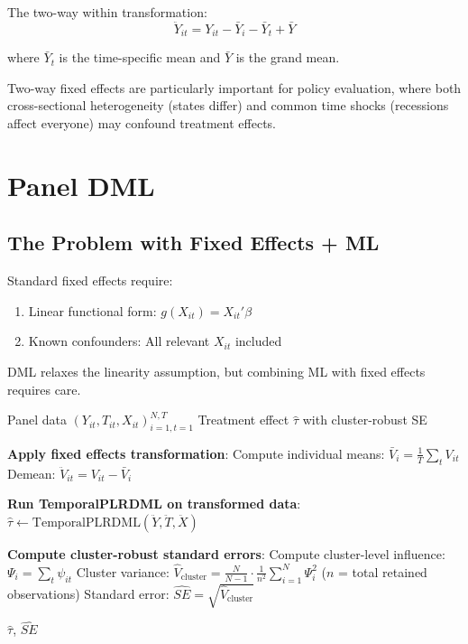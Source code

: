 The two-way within transformation:
\begin{equation}
\ddot{Y}_{it} = Y_{it} - \bar{Y}_i - \bar{Y}_t + \bar{Y}
\end{equation}

where $\bar{Y}_t$ is the time-specific mean and $\bar{Y}$ is the grand mean.

\begin{remark}
Two-way fixed effects are particularly important for policy evaluation, where both cross-sectional heterogeneity (states differ) and common time shocks (recessions affect everyone) may confound treatment effects.
\end{remark}

\section{Panel DML}\label{sec:panel_dml}

\subsection{The Problem with Fixed Effects + ML}

Standard fixed effects require:
\begin{enumerate}
    \item Linear functional form: $g(X_{it}) = X_{it}'\beta$
    \item Known confounders: All relevant $X_{it}$ included
\end{enumerate}

DML relaxes the linearity assumption, but combining ML with fixed effects requires care.

\begin{algorithm}[H]
\caption{Panel DML with Fixed Effects}
\label{alg:panel_dml}
\begin{algorithmic}[1]
\REQUIRE Panel data $(Y_{it}, T_{it}, X_{it})_{i=1,t=1}^{N,T}$
\ENSURE Treatment effect $\hat{\tau}$ with cluster-robust SE

\STATE \textbf{Apply fixed effects transformation}:
    \STATE Compute individual means: $\bar{V}_i = \frac{1}{T}\sum_t V_{it}$
    \STATE Demean: $\ddot{V}_{it} = V_{it} - \bar{V}_i$
\ENDFOR

\STATE \textbf{Run TemporalPLRDML on transformed data}:
\STATE $\hat{\tau} \gets \text{TemporalPLRDML}(\ddot{Y}, \ddot{T}, \ddot{X})$

\STATE \textbf{Compute cluster-robust standard errors}:
    \STATE Compute cluster-level influence: $\Psi_i = \sum_t \psi_{it}$
\ENDFOR
\STATE Cluster variance: $\hat{V}_{\text{cluster}} = \frac{N}{N-1} \cdot \frac{1}{n^2}\sum_{i=1}^{N} \Psi_i^2$ \quad ($n$ = total retained observations)
\STATE Standard error: $\widehat{SE} = \sqrt{\hat{V}_{\text{cluster}}}$

\RETURN $\hat{\tau}$, $\widehat{SE}$
\end{algorithmic}
\end{algorithm}


